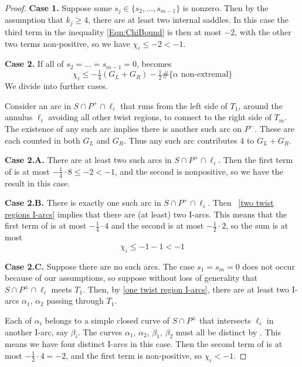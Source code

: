 \documentclass[10pt,a4paper]{amsart}
\begin{document}
\begin{proof}
\textbf{Case 1.} Suppose some $s_j \in \{s_2, \dots, s_{m-1}\}$ is nonzero. Then by the 
assumption that $k_j\geq 4$, there are at least two internal saddles. In this case the 
third term in the inequality \eqref{Eqn:ChiBound} is then at most $-2$, with the other 
two terms non-positive, so we have $\chi_i \leq -2 < -1$. 

\textbf{Case 2.} If all of $s_2= \dots = s_{m-1} =0$,  becomes
\begin{equation}\label{Eqn:ChiBound2}
\chi_i \leq -\tfrac14 (G_L+G_R) - \tfrac12\#\{\alpha\text{ non-extremal}\}
\end{equation}
We divide into further cases.

Consider an arc in $S\cap P^+\cap \ell_i$ that runs from the left side of $T_1$, around 
the annulus $\ell_i$ avoiding all other twist regions, to connect to the right side of $T_m$. 
The existence of any such arc implies there is another such arc on $P^-$. These are each 
counted in both $G_L$ and $G_R$. Thus any such arc contributes $4$ to $G_L+G_R$.  
    
\textbf{Case 2.A.} There are at least two such arcs in $S\cap P^+\cap \ell_i$. 
Then the first term of  is at most $-\tfrac14\cdot 8 \leq -2 < -1$, 
and the second is nonpositive, so we have the result in this case. 

\textbf{Case 2.B.} There is exactly one such arc in $S\cap P^+\cap \ell_i$. Then 
~\ref{two twist regions I-arcs} implies that there are (at least) 
two I-arcs. This means that the first term of  is at most 
$-\tfrac14\cdot 4$ and the second is at most $-\tfrac12 \cdot 2$, so the sum is at most
\[ \chi_i \leq -1 - 1 < -1 \]

\textbf{Case 2.C.}
Suppose there are no such arcs. The case $s_1=s_m=0$ does not occur because of our 
assumptions, so suppose without loss of generality that $S\cap P^\pm \cap \ell_i$ 
meets $T_1$. Then, by  \ref{one twist region I-arcs}, there 
are at least two I-arcs $\alpha_1$, $\alpha_2$ passing through $T_1$.

Each of $\alpha_i$ belongs to a simple closed curve of $S\cap P^\pm$ that intersects 
$\ell_i$ in another I-arc, say $\beta_i$. The curves $\alpha_1$, $\alpha_2$, $\beta_1$,
$\beta_2$ must all be distinct by . This means we have four 
distinct I-arcs in this case. 
Then the second term of  is at most $-\tfrac12 \cdot 4 = -2$, and 
the first term is non-positive, so $\chi_i < -1$. 
\end{proof}
\end{document}
